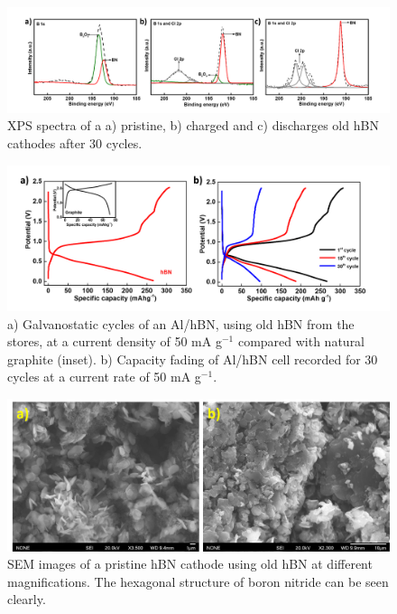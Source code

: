 \begin{figure}[tbh!]
\centering
\includegraphics[width=\textwidth]{Figures/BOhBN/oldhBNXPS}
\caption{XPS spectra of a a) pristine, b) charged and c) discharges old hBN cathodes after 30 cycles.}
\label{Figures/BOhBN:oldhBNXPS}
\end{figure}
 \begin{figure}[tbh!]
\centering
\includegraphics[width=\textwidth]{Figures/BOhBN/hBNiniCDC}
\caption{a) Galvanostatic cycles of an Al/hBN, using old hBN from the stores, at a current density of 50 mA g$^{-1}$ compared with natural graphite (inset). b) Capacity fading of Al/hBN cell recorded for 30 cycles at a current rate of 50 mA g$^{-1}$.}
\label{Figures/BOhBN:hBNiniCDC}
\end{figure}
\begin{figure}[tbh!]
\centering
\includegraphics[width=\textwidth]{Figures/BOhBN/hBNSEM}
\caption{SEM images of a pristine hBN cathode using old hBN at different magnifications. The hexagonal structure of boron nitride can be seen clearly.}
\label{Figures/BOhBN:hBNSEM}
\end{figure}
